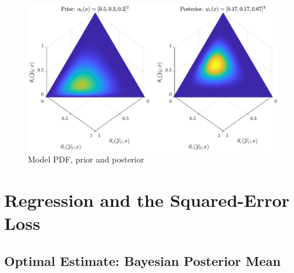 \documentclass{article}
\DeclareMathOperator{\xrm}{\mathrm{x}}
\DeclareMathOperator{\yrm}{\mathrm{y}}
\DeclareMathOperator{\Drm}{\mathrm{D}}
\DeclareMathOperator{\Prm}{\mathrm{P}}
\begin{document}
\begin{figure}
	\centering
	\includegraphics[width=0.9\linewidth]{P_theta_post_SSP.pdf}
	\caption{Model PDF, prior and posterior}
	\label{fig:P_theta_post_tilde}
\end{figure}



%









\section{Regression and the Squared-Error Loss}



\subsection{Optimal Estimate: Bayesian Posterior Mean}
\end{document}
